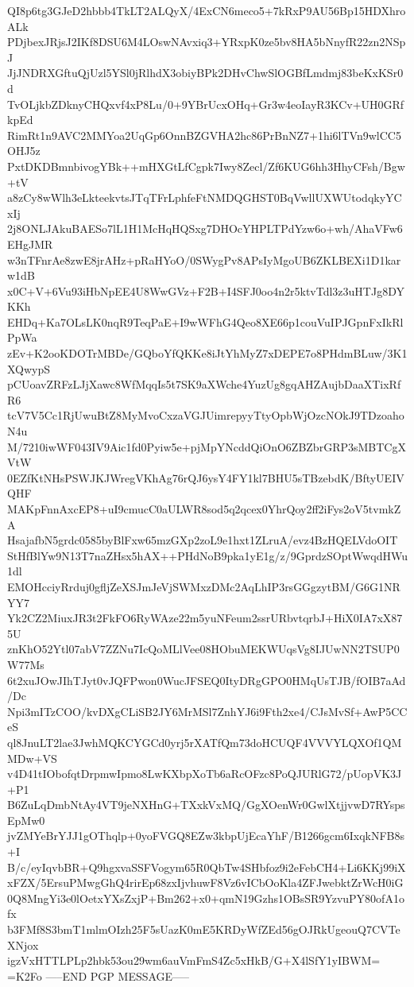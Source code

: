 QI8p6tg3GJeD2hbbb4TkLT2ALQyX/4ExCN6meco5+7kRxP9AU56Bp15HDXhroALk
PDjbexJRjsJ2IKf8DSU6M4LOswNAvxiq3+YRxpK0ze5bv8HA5bNnyfR22zn2NSpJ
JjJNDRXGftuQjUzl5YSl0jRlhdX3obiyBPk2DHvChwSlOGBfLmdmj83beKxKSr0d
TvOLjkbZDknyCHQxvf4xP8Lu/0+9YBrUcxOHq+Gr3w4eoIayR3KCv+UH0GRfkpEd
RimRt1n9AVC2MMYoa2UqGp6OnnBZGVHA2hc86PrBnNZ7+1hi6lTVn9wlCC5OHJ5z
PxtDKDBmnbivogYBk++mHXGtLfCgpk7Iwy8Zecl/Zf6KUG6hh3HhyCFsh/Bgw+tV
a8zCy8wWlh3eLkteekvtsJTqTFrLphfeFtNMDQGHST0BqVwllUXWUtodqkyYCxIj
2j8ONLJAkuBAESo7lL1H1McHqHQSxg7DHOcYHPLTPdYzw6o+wh/AhaVFw6EHgJMR
w3nTFnrAe8zwE8jrAHz+pRaHYoO/0SWygPv8APsIyMgoUB6ZKLBEXi1D1karw1dB
x0C+V+6Vu93iHbNpEE4U8WwGVz+F2B+I4SFJ0oo4n2r5ktvTdl3z3uHTJg8DYKKh
EHDq+Ka7OLsLK0nqR9TeqPaE+I9wWFhG4Qeo8XE66p1couVuIPJGpnFxIkRlPpWa
zEv+K2ooKDOTrMBDe/GQboYfQKKe8iJtYhMyZ7xDEPE7o8PHdmBLuw/3K1XQwypS
pCUoavZRFzLJjXawc8WfMqqIs5t7SK9aXWche4YuzUg8gqAHZAujbDaaXTixRfR6
tcV7V5Cc1RjUwuBtZ8MyMvoCxzaVGJUimrepyyTtyOpbWjOzcNOkJ9TDzoahoN4u
M/7210iwWF043IV9Aic1fd0Pyiw5e+pjMpYNcddQiOnO6ZBZbrGRP3sMBTCgXVtW
0EZfKtNHsPSWJKJWregVKhAg76rQJ6ysY4FY1kl7BHU5sTBzebdK/BftyUEIVQHF
MAKpFnnAxcEP8+uI9cmucC0aULWR8sod5q2qcex0YhrQoy2ff2iFys2oV5tvmkZA
HsajafbN5grdc0585byBlFxw65mzGXp2zoL9e1hxt1ZLruA/evz4BzHQELVdoOIT
StHfBlYw9N13T7naZHsx5hAX++PHdNoB9pka1yE1g/z/9GprdzSOptWwqdHWu1dl
EMOHcciyRrduj0gfljZeXSJmJeVjSWMxzDMc2AqLhIP3rsGGgzytBM/G6G1NRYY7
Yk2CZ2MiuxJR3t2FkFO6RyWAze22m5yuNFeum2ssrURbvtqrbJ+HiX0IA7xX875U
znKhO52Ytl07abV7ZZNu7IcQoMLlVee08HObuMEKWUqsVg8IJUwNN2TSUP0W77Ms
6t2xuJOwJIhTJyt0vJQFPwon0WucJFSEQ0ItyDRgGPO0HMqUsTJB/fOIB7aAd/Dc
Npi3mITzCOO/kvDXgCLiSB2JY6MrMSl7ZnhYJ6i9Fth2xe4/CJsMvSf+AwP5CCeS
ql8JnuLT2lae3JwhMQKCYGCd0yrj5rXATfQm73doHCUQF4VVVYLQXOf1QMMDw+VS
v4D41tIObofqtDrpmwIpmo8LwKXbpXoTb6aRcOFzc8PoQJURlG72/pUopVK3J+P1
B6ZuLqDmbNtAy4VT9jeNXHnG+TXxkVxMQ/GgXOenWr0GwlXtjjvwD7RYspsEpMw0
jvZMYeBrYJJ1gOThqlp+0yoFVGQ8EZw3kbpUjEcaYhF/B1266gcm6IxqkNFB8s+I
B/c/eyIqvbBR+Q9hgxvaSSFVogym65R0QbTw4SHbfoz9i2eFebCH4+Li6KKj99iX
xFZX/5ErsuPMwgGhQ4rirEp68zxIjvhuwF8Vz6vICbOoKla4ZFJwebktZrWcH0iG
0Q8MngYi3e0lOetxYXsZxjP+Bm262+x0+qmN19Gzhs1OBsSR9YzvuPY80ofA1ofx
b3FMf8S3bmT1mlmOIzh25F5sUazK0mE5KRDyWfZEd56gOJRkUgeouQ7CVTeXNjox
igzVxHTTLPLp2hbk53ou29wm6auVmFmS4Zc5xHkB/G+X4lSfY1yIBWM=
=K2Fo
-----END PGP MESSAGE-----
